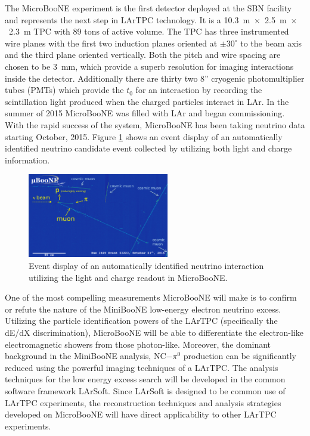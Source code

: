 \label{sec:IF_MicroBooNE}
The MicroBooNE experiment is the first detector deployed at the SBN facility and represents the next step in LArTPC technology. It is a 10.3~m~$\times$~2.5~m~$\times$~2.3~m TPC with 89 tons of active volume. The TPC has three instrumented wire planes with the first two induction planes oriented at $\pm 30^{\circ}$ to the beam axis and the third plane oriented vertically. Both the pitch and wire spacing are chosen to be 3~mm, which provide a superb resolution for imaging interactions inside the detector. Additionally there are thirty two 8'' cryogenic photomultiplier tubes (PMTs) which provide the $t_{0}$ for an interaction by recording the scintillation light produced when the charged particles interact in LAr. In the summer of 2015 MicroBooNE was filled with LAr and began commissioning.  With the rapid success of the system, MicroBooNE has been taking neutrino data starting October, 2015. Figure \ref{fig:uboone} shows an event display of an automatically identified neutrino candidate event collected by utilizing both light and charge information. 

\begin{figure}[htb]
\centering
\includegraphics[width=0.55\textwidth]{images/ubooneNeutrino.png}
\caption[]{Event display of an automatically identified neutrino interaction utilizing the light and charge readout in MicroBooNE.}
\label{fig:uboone}
\end{figure}

One of the most compelling measurements MicroBooNE will make is to confirm or refute the nature of the MiniBooNE low-energy electron neutrino excess. Utilizing the particle identification powers of the LArTPC (specifically the dE/dX discrimination), MicroBooNE will be able to differentiate the electron-like electromagnetic showers from those photon-like. Moreover, the dominant background in the MiniBooNE analysis, NC$-\pi^{0}$ production can be significantly reduced using the powerful imaging techniques of a LArTPC. The analysis techniques for the low energy excess search will be developed in the common software framework LArSoft. Since LArSoft is designed to be common use of LArTPC experiments, the reconstruction techniques and analysis strategies developed on MicroBooNE will have direct applicability to other LArTPC experiments.

